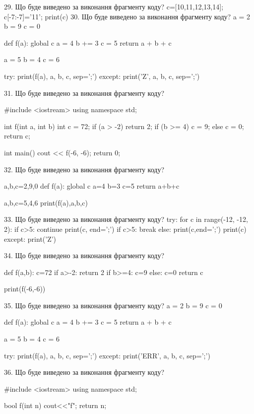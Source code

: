 \documentclass[11pt]{article}
\begin{document}
29. Що буде виведено за виконання фрагменту коду?
c=[10,11,12,13,14]; c[-7:-7]='11'; print(c)
30. Що буде виведено за виконання фрагменту коду?
a = 2
b = 9
c = 0

def f(a):
global c    a = 4
    b += 3
    c = 5
    return a + b + c

a = 5
b = 4
c = 6

try:
    print(f(a), a, b, c, sep=';')
except:
    print('Z', a, b, c, sep=';')

31. Що буде виведено за виконання фрагменту коду?

#include <iostream>
using namespace std;

int f(int a, int b){
    int c = 72;
    if (a > -2)
        return 2;
    if (b >= 4)
         c = 9;
    else 
        c = 0;
    return c;
}

int main(){
    cout << f(-6, -6);
    return 0;
}

32. Що буде виведено за виконання фрагменту коду?

a,b,c=2,9,0
def f(a):
global c    a=4
    b=3
    c=5
    return a+b+c

a,b,c=5,4,6
print(f(a),a,b,c)

33. Що буде виведено за виконання фрагменту коду?
try:
    for c in range(-12, -12, 2):
        if c>5:
            continue
        print(c, end=';')
        if c>5:
            break
    else:
        print(c,end=';')
    print(c)
except:
    print('Z')

34. Що буде виведено за виконання фрагменту коду?

def f(a,b):
    c=72
    if a>-2:
        return 2
    if b>=4:
         c=9
    else: 
        c=0
    return c

print(f(-6,-6))

35. Що буде виведено за виконання фрагменту коду?
a = 2
b = 9
c = 0

def f(a):
global c    a = 4
    b += 3
    c = 5
    return a + b + c

a = 5
b = 4
c = 6

try:
    print(f(a), a, b, c, sep=';')
except:
    print('ERR', a, b, c, sep=';')

36. Що буде виведено за виконання фрагменту коду?

#include <iostream>
using namespace std;

bool f(int n){
    cout<<"f";
    return n;
}
\end{document}
